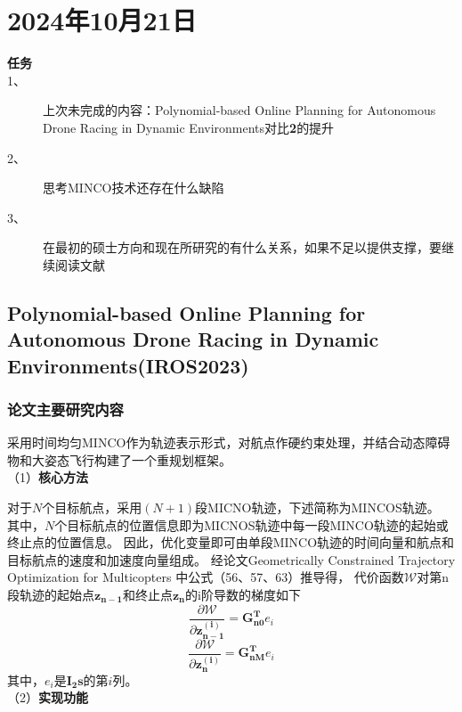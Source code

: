 \section{2024年10月21日}
\begin{tcolorbox}[cyan]
    \begin{description}
        \item[\large \textbf{任务}]
        \item[1、] 上次未完成的内容：Polynomial-based Online Planning for Autonomous Drone Racing in Dynamic Environments对比\textbf{2}的提升
        \item[2、] 思考MINCO技术还存在什么缺陷
        \item[3、] 在最初的硕士方向和现在所研究的有什么关系，如果不足以提供支撑，要继续阅读文献
    \end{description}
\end{tcolorbox}
\subsection{Polynomial-based Online Planning for Autonomous Drone Racing in Dynamic Environments(IROS2023)}
\subsubsection{论文主要研究内容}
采用时间均匀MINCO作为轨迹表示形式，对航点作硬约束处理，并结合动态障碍物和大姿态飞行构建了一个重规划框架。\\
（1）\textbf{核心方法}


对于$N$个目标航点，采用$(N+1)$段MICNO轨迹，下述简称为MINCOS轨迹。
其中，$N$个目标航点的位置信息即为MICNOS轨迹中每一段MINCO轨迹的起始或终止点的位置信息。
因此，优化变量即可由单段MINCO轨迹的时间向量和航点和目标航点的速度和加速度向量组成。
经论文Geometrically Constrained Trajectory Optimization for Multicopters 中公式（56、57、63）推导得，
代价函数$\mathcal{W} $对第n段轨迹的起始点$\mathbf{z_{n-1}}$和终止点$\mathbf{z_{n}}$的i阶导数的梯度如下
\begin{equation}
    \frac{\partial \mathcal{W} }{\partial \mathbf{z_{n-1}^{(i)}}} = \mathbf{G_{n0}^T}e_{i} 
\end{equation}
\begin{equation}
\frac{\partial \mathcal{W} }{\partial \mathbf{z_{n}^{(i)}}} = \mathbf{G_{nM}^T}e_{i}
\end{equation}
其中，$e_i$是$\mathbf{I_2s}$的第$i$列。\\
（2）\textbf{实现功能}


